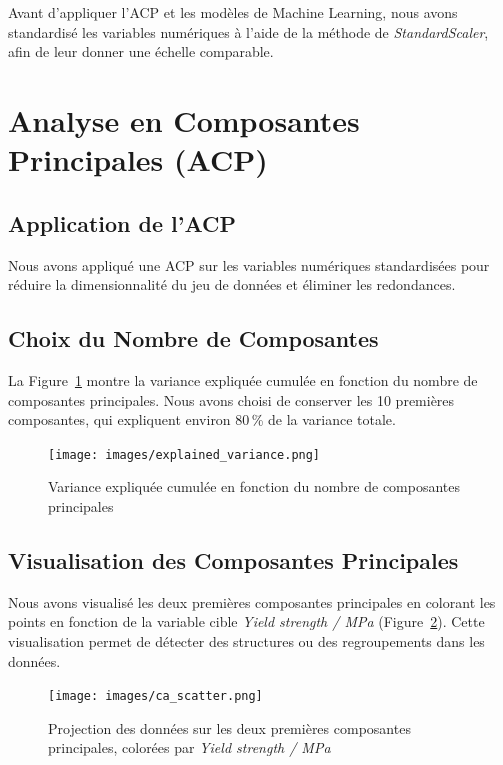 \documentclass{article}
\begin{document}
Avant d'appliquer l'ACP et les modèles de Machine Learning, nous avons standardisé les variables numériques à l'aide de la méthode de \textit{StandardScaler}, afin de leur donner une échelle comparable.

\section{Analyse en Composantes Principales (ACP)}

\subsection{Application de l'ACP}

Nous avons appliqué une ACP sur les variables numériques standardisées pour réduire la dimensionnalité du jeu de données et éliminer les redondances.

\subsection{Choix du Nombre de Composantes}

La Figure~\ref{fig:explained_variance} montre la variance expliquée cumulée en fonction du nombre de composantes principales. Nous avons choisi de conserver les 10 premières composantes, qui expliquent environ 80\,\% de la variance totale.

\begin{figure}[H]
    \centering
    \texttt{[image: images/explained\_variance.png]}
    \caption{Variance expliquée cumulée en fonction du nombre de composantes principales}
    \label{fig:explained_variance}
\end{figure}

\subsection{Visualisation des Composantes Principales}

Nous avons visualisé les deux premières composantes principales en colorant les points en fonction de la variable cible \textit{Yield strength / MPa} (Figure~\ref{fig:pca_scatter}). Cette visualisation permet de détecter des structures ou des regroupements dans les données.

\begin{figure}[H]
    \centering
    \texttt{[image: images/ca\_scatter.png]}
    \caption{Projection des données sur les deux premières composantes principales, colorées par \textit{Yield strength / MPa}}
    \label{fig:pca_scatter}
\end{figure}
\end{document}
